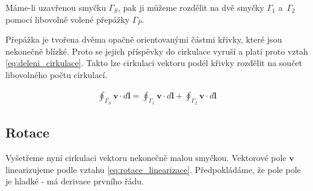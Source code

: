 \documentclass{book}
\newcommand{\vect}[1]{\boldsymbol{#1}}
\begin{document}
Máme-li uzavřenou smyčku \(\Gamma_S\), pak ji můžeme rozdělit na dvě smyčky \(\Gamma_1\) a~\(\Gamma_2\) pomocí libovolně volené přepážky \(\Gamma_P\).


Přepážka je tvořena dvěma opačně orientovanými částmi křivky, které jsou nekonečně blízké. Proto se jejich příspěvky do cirkulace vyruší a platí proto vztah \eqref{eq:deleni_cirkulace}. Takto lze cirkulaci vektoru podél křivky rozdělit na součet libovolného počtu cirkulací.

\begin{equation}
\label{eq:deleni_cirkulace}
\begin{split}
\oint_{\Gamma_S} \vect{v} \cdot d\vect{l} = \oint_{\Gamma_1} \vect{v} \cdot d\vect{l} + \oint_{\Gamma_2} \vect{v} \cdot d\vect{l}
\end{split}
\end{equation}

\subsection{Rotace}
\label{sec:rotace}

Vyšetřeme nyní cirkulaci vektoru nekonečně malou smyčkou. Vektorové pole \(\vect{v}\) linearizujeme podle vztahu \eqref{eq:rotace_linearizace}.
Předpokládáme, že pole pole je hladké - má derivace prvního řádu.
\end{document}
